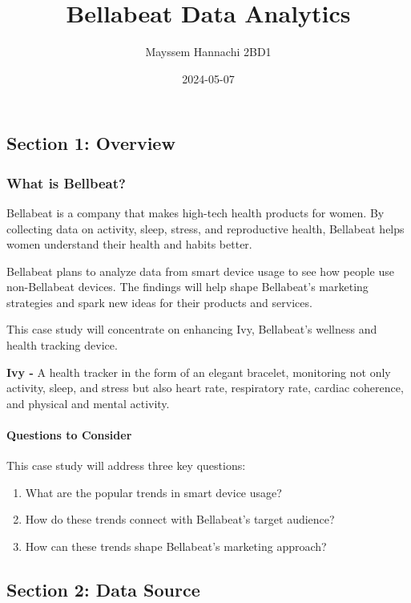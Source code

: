 \documentclass[
]{article}
\title{Bellabeat Data Analytics}
\author{Mayssem Hannachi 2BD1}
\date{2024-05-07}
\begin{document}
\maketitle

\hypertarget{section-1-overview}{%
\subsection{Section 1: Overview}\label{section-1-overview}}

\hypertarget{what-is-bellbeat}{%
\subsubsection{What is Bellbeat?}\label{what-is-bellbeat}}

Bellabeat is a company that makes high-tech health products for women.
By collecting data on activity, sleep, stress, and reproductive health,
Bellabeat helps women understand their health and habits better.

Bellabeat plans to analyze data from smart device usage to see how
people use non-Bellabeat devices. The findings will help shape
Bellabeat's marketing strategies and spark new ideas for their products
and services.

This case study will concentrate on enhancing Ivy, Bellabeat's wellness
and health tracking device.

\textbf{Ivy -} A health tracker in the form of an elegant bracelet,
monitoring not only activity, sleep, and stress but also heart rate,
respiratory rate, cardiac coherence, and physical and mental activity.

\hypertarget{questions-to-consider}{%
\paragraph{Questions to Consider}\label{questions-to-consider}}

This case study will address three key questions:

\begin{enumerate}
\def\labelenumi{\arabic{enumi}.}
\item
  What are the popular trends in smart device usage?
\item
  How do these trends connect with Bellabeat's target audience?
\item
  How can these trends shape Bellabeat's marketing approach?
\end{enumerate}

\hypertarget{section-2-data-source}{%
\subsection{Section 2: Data Source}\label{section-2-data-source}}
\end{document}
